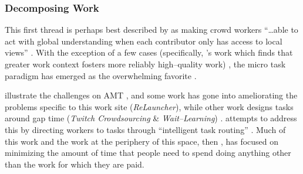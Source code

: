 \documentclass[trackingWork]{subfiles}
\begin{document}
\subsubsection[decomposing work]{Decomposing Work}\label{sec:decomposition}

\subsubsubsection{\crowdworkpers}
This first thread is
perhaps best described by \citeauthor{verroios2014context} as
making crowd workers ``\dots able to act with
global understanding when each contributor only has access to local views''
\cite{verroios2014context}.
With the exception of a few cases
(specifically, \citeauthor{Kinnaird:2012:WTM:2389176.2389219}'s work
which finds that greater work context fosters more reliably high--quality work)%
, the micro task paradigm has emerged as the overwhelming favorite
\cite{selfsourcingTeevan2014,selfsourcingTeevan2016%
,       cheng2015break,Kinnaird:2012:WTM:2389176.2389219}.


\citeauthor{taskSearch} illustrate the challenges on AMT%
, and some work has gone into ameliorating the problems specific to this work site
(\textit{ReLauncher}), %
while other work designs tasks around gap time
(\textit{Twitch Crowdsourcing} \& \textit{Wait--Learning})
\cite{taskSearch,KucherbaevReLauncher,Vaish:2014:TCC:2611222.2556996%
,       Cai:2015:WLW:2702123.2702267}.
\citeauthor{Cosley:2007:SUI:1216295.1216309}
attempts to address this by
directing workers to tasks through
``intelligent task routing''
\cite{Cosley:2007:SUI:1216295.1216309}.
Much of this work and the work at the periphery of this space, then%
, has focused on
minimizing the amount of time that people need to spend doing
anything other than the work for which they are paid.
\end{document}

